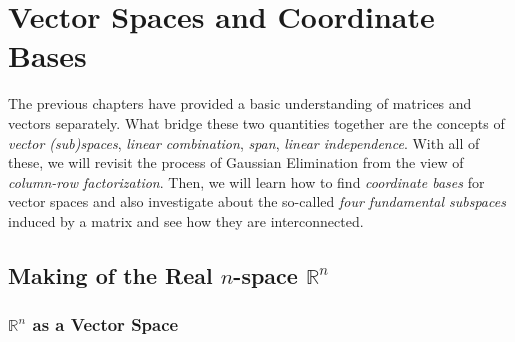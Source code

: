 \chapter{Vector Spaces and Coordinate Bases}
\label{chap:vec_space}

The previous chapters have provided a basic understanding of matrices and vectors separately. What bridge these two quantities together are the concepts of \textit{vector (sub)spaces}, \textit{linear combination}, \textit{span}, \textit{linear independence}. With all of these, we will revisit the process of Gaussian Elimination from the view of \textit{column-row factorization}. Then, we will learn how to find \textit{coordinate bases} for vector spaces and also investigate about the so-called \textit{four fundamental subspaces} induced by a matrix and see how they are interconnected. 

\section{Making of the Real $n$-space $\mathbb{R}^n$}

\subsection{$\mathbb{R}^n$ as a Vector Space}

